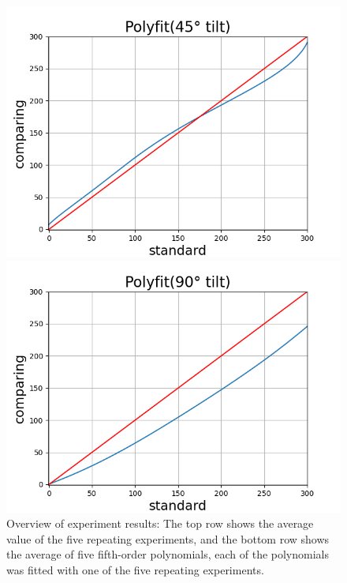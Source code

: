 \documentclass[conference]{IEEEtran}
\begin{document}
\begin{figure}[htbp]
\begin{minipage}[t]{0.32\textwidth}
  \end{minipage}
  \hfill
  \begin{minipage}[t]{0.32\textwidth}
    \centering
    \includegraphics[width=\textwidth]{pics/Section3/Polyfit45.png}

  \end{minipage}
  \hfill
  \begin{minipage}[t]{0.32\textwidth}
    \centering
    \includegraphics[width=\textwidth]{pics/Section3/Polyfit90.png}

  \end{minipage}
  \caption{Overview of experiment results: The top row shows the average value of the five repeating experiments, and the bottom row shows the average of five fifth-order polynomials, each of the polynomials was fitted with one of the five repeating experiments.}
  \label{fig:OverallResult}


\end{figure}
\end{document}
